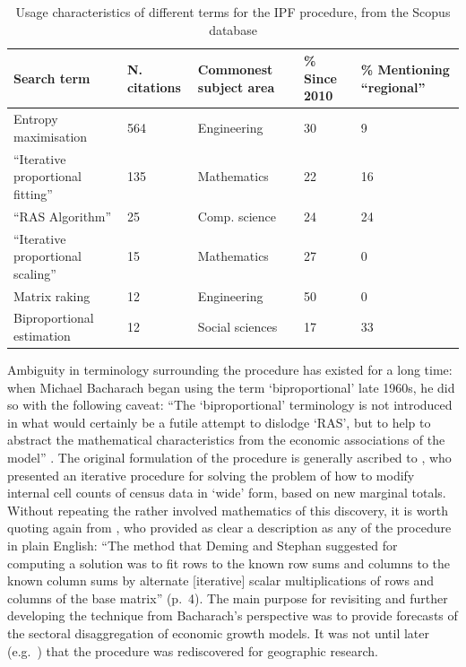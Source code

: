 \documentclass[a4paper,10pt]{article}
\begin{document}
\begin{table}[htbp]
\caption{Usage characteristics of different terms for the IPF procedure, from the Scopus database}
\begin{tabular}{lp{1.5cm}p{2.5cm}p{1.5cm}p{2.5cm}}
\toprule
Search term & N. citations & Commonest subject area & \% Since 2010 & \% Mentioning ``regional'' \\
\midrule
Entropy maximisation & 564 & Engineering & 30 & 9 \\
``Iterative proportional fitting''  & 135 & Mathematics & 22\ & 16 \\
``RAS Algorithm'' & 25 & Comp. science & 24 & 24 \\
``Iterative proportional scaling'' & 15 & Mathematics & 27 & 0 \\
Matrix raking & 12 & Engineering & 50 & 0 \\
Biproportional estimation & 12 & Social sciences & 17 & 33 \\
\bottomrule
\end{tabular}
\label{tterms}
\end{table}

Ambiguity in terminology surrounding the procedure has existed for a long time:
when Michael Bacharach began using the term `biproportional' late 1960s, he did so with the
following caveat: ``The `biproportional' terminology is not introduced in what
would certainly be a futile attempt to dislodge `RAS', but to help to abstract the
mathematical characteristics from the economic associations of the model'' \citep{bacharach1970biproportional}.
The original formulation of the procedure is generally ascribed to \citet{Deming1940},
who presented an iterative procedure for solving the problem of how to modify internal cell counts
of census data in `wide' form, based on new marginal totals. Without repeating
the rather involved mathematics of this discovery, it is worth quoting again from
\citet{bacharach1970biproportional}, who provided as clear a description as any of the procedure
in plain English: ``The method that Deming and Stephan suggested for
computing a solution was to fit rows to the known row sums and columns to the known
column sums by alternate [iterative] scalar multiplications of rows and columns of the
base matrix'' (p.~4). The main purpose for revisiting and further developing the technique
from Bacharach's perspective was to provide forecasts of the sectoral disaggregation of
economic growth models. It was not until later
(e.g.~\citealp{Holm1987}) that the procedure was rediscovered for geographic research.
\end{document}
